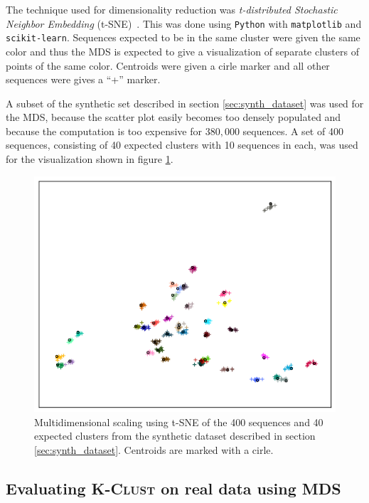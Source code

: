 The technique used for dimensionality reduction was \emph{t-distributed
Stochastic Neighbor Embedding} (t-SNE)~\cite{maaten}. This was done using
\texttt{Python} with \texttt{matplotlib} and \texttt{scikit-learn}. Sequences
expected to be in the same cluster were given the same color and thus the MDS
is expected to give a visualization of separate clusters of points of the same
color. Centroids were given a cirle marker and all other sequences were gives a
``+'' marker.

A subset of the synthetic set described in section \ref{sec:synth_dataset} was
used for the MDS, because the scatter plot easily becomes too densely populated
and because the computation is too expensive for $380,000$ sequences. A set of
400 sequences, consisting of 40 expected clusters with 10 sequences in each,
was used for the visualization shown in figure \ref{fig:mds_synth}.

\begin{figure}[H]
  \includegraphics[width=\textwidth]{graphics/MDS_t-SNE_synth_silva_400.png}
  \caption{Multidimensional scaling using t-SNE of the 400 sequences and
    40 expected clusters from the synthetic dataset described in section
    \ref{sec:synth_dataset}. Centroids are marked with a cirle.}
  \label{fig:mds_synth}
\end{figure}



\subsection{Evaluating \textsc{K-Clust} on real data using MDS}

